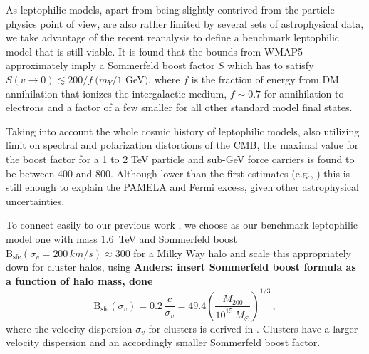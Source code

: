 \documentclass[10pt,aps,pra,reprint,amsmath,amsfonts,amssymb,showpacs,nofootinbib,floatfix]{revtex4-1}
\newcommand{\rmn}{\mathrm}
\newcommand{\sfe}{\rmn{sfe}}
\newcommand{\msun}{M_\odot}
\newcommand{\B}{\rmn{B}}
\newcommand{\sigv}{\ensuremath{\sigma_v}}
\newcommand{\mvir}{M_{200}}
\begin{document}
As leptophilic models, apart from being slightly contrived from the
particle physics point of view, are also rather limited by several
sets of astrophysical data, we take advantage of the recent reanalysis
\cite{Finkbeiner:2010sm} to define a benchmark leptophilic model that
is still viable.  It is found that the bounds from WMAP5 approximately
imply a Sommerfeld boost factor $S$ which has to satisfy $S(v\to
0)\lesssim 200/f\ (m_Y/1$ GeV$)$, where $f$ is the fraction of energy
from DM annihilation that ionizes the intergalactic medium,
$f\sim 0.7$ for annihilation to electrons and a factor of a few smaller
for all other standard model final states.

Taking into account the whole cosmic history of leptophilic models,
also utilizing limit on spectral and polarization distortions of the
CMB, the maximal value for the boost factor for a 1 to 2 TeV particle
and sub-GeV force carriers is found to be \cite{Finkbeiner:2010sm}
between 400 and 800. Although lower than the first estimates (e.g.,
\cite{Bergstrom:2009fa,Meade:2009iu}) this is still enough to explain
the PAMELA and Fermi excess, given other astrophysical uncertainties.

To connect easily to our previous work \cite{2009PhRvL.103r1302P}, we
choose as our benchmark leptophilic model one with mass $1.6$~TeV and
Sommerfeld boost $\B_\sfe(\sigv=200\,km/s)\approx 300$ for a Milky Way
halo and scale this appropriately down for cluster halos, using {\bf
  Anders: insert Sommerfeld boost formula as a function of halo mass, done}
\begin{equation}
\B_\sfe(\sigv) = 0.2\, \frac{c}{\sigv} = 
49.4 \left(\frac{\mvir}{10^{15}\,\msun}\right)^{1/3}\,,
\label{eq:B_sfe}
\end{equation}
where the velocity dispersion $\sigv$ for clusters is derived in
\cite{2005RvMP...77..207V}. Clusters have a larger velocity
dispersion and an accordingly smaller Sommerfeld boost factor.
\end{document}
